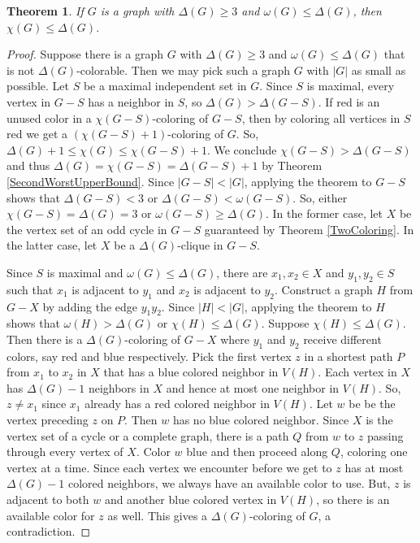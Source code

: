 \documentclass{amsbook}
\theoremstyle{plain}
\newtheorem{theorem}{Theorem}
\numberwithin{equation}{chapter}
\newcommand{\card}[1]{\left|#1\right|}
\newcommand{\parens}[1]{\left( #1 \right)}
\begin{document}
\begin{theorem}
If $G$ is a graph with $\Delta(G) \ge 3$ and $\omega(G) \le \Delta(G)$, then $\chi(G) \le \Delta(G)$.
\label{BrooksTheorem}
\end{theorem}
\begin{proof}
Suppose there is a graph $G$  with $\Delta(G) \ge 3$ and $\omega(G) \le \Delta(G)$ that is not $\Delta(G)$-colorable.  
Then we may pick such a graph $G$ with $\card{G}$ as small as possible.  Let $S$ be 
a maximal independent set in $G$.  Since $S$ is maximal, every vertex in $G-S$ has a neighbor in $S$, so $\Delta(G) > \Delta(G-S)$.
If red is an unused color in a $\chi(G-S)$-coloring of $G-S$, then by coloring all vertices in $S$ red we get a $\parens{\chi(G-S)+1}$-coloring of $G$.  
So, $\Delta(G) + 1 \le \chi(G) \le \chi(G-S) + 1$. We conclude $\chi(G-S) > \Delta(G - S)$ and thus $\Delta(G) = \chi(G-S) = \Delta(G-S) + 1$ by Theorem \ref{SecondWorstUpperBound}.
Since $\card{G-S} < \card{G}$, applying the theorem to $G-S$ shows that $\Delta(G-S) < 3$ or $\Delta(G -S) < \omega(G - S)$.  
So, either $\chi(G-S) = \Delta(G) = 3$ or $\omega(G-S) \ge \Delta(G)$.  In the former case, let $X$ be the vertex set of an odd cycle in $G-S$ guaranteed by Theorem \ref{TwoColoring}.  
In the latter case, let $X$ be a $\Delta(G)$-clique in $G-S$.

Since $S$ is maximal and $\omega(G) \le \Delta(G)$, there are $x_1, x_2 \in X$ and $y_1, y_2 \in S$ such that $x_1$ is adjacent to $y_1$ and $x_2$ is adjacent to $y_2$.
Construct a graph $H$ from $G-X$ by adding the edge $y_1y_2$.  Since $\card{H} < \card{G}$, applying the theorem to $H$ shows that $\omega(H) > \Delta(G)$ or $\chi(H) \le \Delta(G)$.
Suppose $\chi(H) \le \Delta(G)$.  Then there is a $\Delta(G)$-coloring of $G-X$ where $y_1$ and $y_2$ receive different colors, say red and blue respectively.
Pick the first vertex $z$ in a shortest path $P$ from $x_1$ to $x_2$ in $X$ that has a blue colored neighbor in $V(H)$. 
Each vertex in $X$ has $\Delta(G)-1$ neighbors in $X$ and hence at most one neighbor in $V(H)$.  So, $z \ne x_1$ since $x_1$ already has a red colored neighbor in $V(H)$.
Let $w$ be be the vertex preceding $z$ on $P$. Then $w$ has no blue colored neighbor.  Since $X$ is the vertex set of a cycle or a 
complete graph, there is a path $Q$ from $w$ to $z$ passing through every vertex of $X$.  Color $w$ blue and then proceed along $Q$, coloring one vertex at a time.  
Since each vertex we encounter before we get to $z$ has at most $\Delta(G) - 1$ colored neighbors, we always have an available color to use.  But, $z$ is adjacent
to both $w$ and another blue colored vertex in $V(H)$, so there is an available color for $z$ as well.  This gives a $\Delta(G)$-coloring of $G$, a contradiction.


\end{proof}
\end{document}
